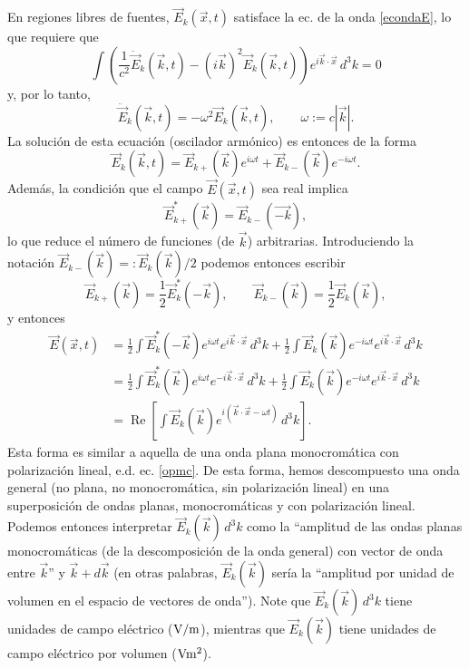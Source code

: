 En regiones libres de fuentes, $\vec{E}_k(\vec{x},t)$ satisface la ec. de la onda \eqref{econdaE}, lo que requiere que 
\begin{equation}
\int\left(\frac{1}{c^2}\ddot{\vec{E}}_k(\vec{k},t)-(i\vec{k})^2\vec{E}_k(\vec{k},t)\right)e^{i\vec{k}\cdot\vec{x}}\,d^3k=0
\end{equation}
y, por lo tanto,
\begin{equation}
\ddot{\vec{E}}_k(\vec{k},t)=-\omega^2\vec{E}_k(\vec{k},t), \qquad \omega:=c|\vec{k}|.
\end{equation}
La solución de esta ecuación (oscilador armónico) es entonces de la forma
\begin{equation}
\vec{E}_k(\vec{k},t) = \vec{E}_{k+}(\vec{k})e^{i\omega t}+\vec{E}_{k-}(\vec{k})e^{-i\omega t}.
\end{equation}
Además, la condición que el campo $\vec{E}(\vec{x},t)$ sea real implica
\begin{equation}
\vec{E}^*_{k+}(\vec{k}) = \vec{E}_{k-}(\vec{-k}),
\end{equation}
lo que reduce el número de funciones (de $\vec{k}$) arbitrarias. Introduciendo la notación $\vec{E}_{k-}(\vec{k}) =: \vec{E}_{k}(\vec{k})/2$ podemos entonces escribir
\begin{equation}
\vec{E}_{k+}(\vec{k}) = \frac{1}{2}\vec{E}^*_{k}(-\vec{k}),   \qquad \vec{E}_{k-}(\vec{k})= \frac{1}{2}\vec{E}_{k}(\vec{k}),
\end{equation}
y entonces
\begin{align}
\vec{E}(\vec{x},t) &= \frac{1}{2}\int\vec{E}^*_{k}(-\vec{k})e^{i\omega t}e^{i\vec{k}\cdot\vec{x}}\,d^3k + \frac{1}{2}\int\vec{E}_{k}(\vec{k})e^{-i\omega t}e^{i\vec{k}\cdot\vec{x}}\,d^3k \\
&= \frac{1}{2}\int\vec{E}^*_{k}(\vec{k})e^{i\omega t}e^{-i\vec{k}\cdot\vec{x}}\,d^3k + \frac{1}{2}\int\vec{E}_{k}(\vec{k})e^{-i\omega t}e^{i\vec{k}\cdot\vec{x}}\,d^3k \\
&= \operatorname{Re}\left[\int\vec{E}_{k}(\vec{k})e^{i(\vec{k}\cdot\vec{x}-\omega t)}\,d^3k\right].
\end{align}
Esta forma es similar a aquella de una onda plana monocromática con polarización lineal, e.d. ec. \eqref{opmc}. De esta forma, hemos descompuesto una onda general (no plana, no monocromática, sin polarización lineal) en una superposición de ondas planas, monocromáticas y con polarización lineal. Podemos entonces interpretar $\vec{E}_{k}(\vec{k})\,d^3k$ como la ``amplitud de las ondas planas monocromáticas (de la descomposición de la onda general) con vector de onda entre $\vec{k}$'' y $\vec{k}+d\vec{k}$ (en otras palabras, $\vec{E}_{k}(\vec{k})$ sería la ``amplitud por unidad de volumen en el espacio de vectores de onda''). Note que $\vec{E}_{k}(\vec{k})\,d^3k$ tiene unidades de campo eléctrico ($\rm V/m$), mientras que $\vec{E}_{k}(\vec{k})$ tiene unidades de campo eléctrico por volumen ($\rm V m^2$).

